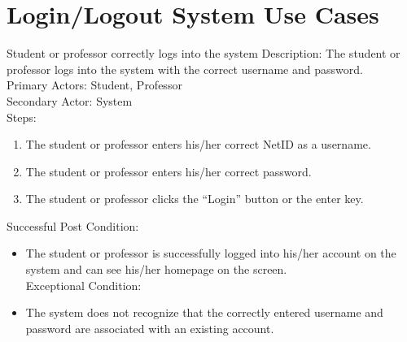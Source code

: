 
\chapter{Login/Logout System Use Cases}
    \begin{section}{Student or professor correctly logs into the system}
        Description: The student or professor logs into the system with the correct username and password.\\
        Primary Actors: Student, Professor\\
        Secondary Actor: System\\
        Steps:
        \begin{enumerate}
            \item The student or professor enters his/her correct NetID as a username.
            \item The student or professor enters his/her correct password.
            \item The student or professor clicks the “Login” button or the enter key.
        \end{enumerate}
        Successful Post Condition:\\
        \begin{itemize}
        \item The student or professor is successfully logged into his/her account on the system and can see his/her homepage on the screen.\\
        Exceptional Condition:
        \item The system does not recognize that the correctly entered username and password are associated with an existing account.
        \end{itemize}
        \end{section}
